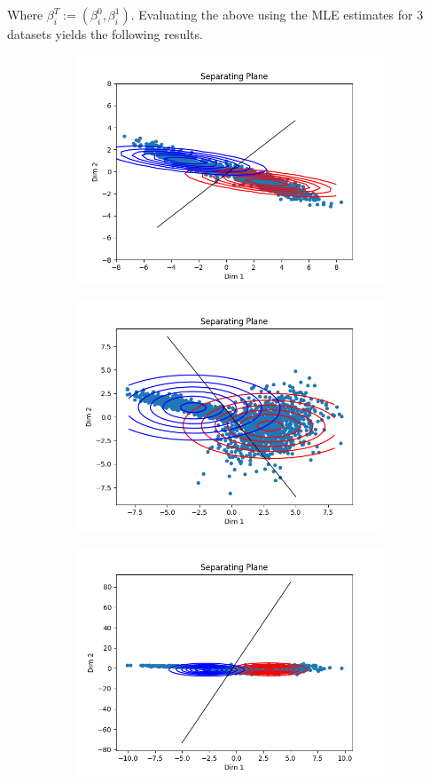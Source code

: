 \documentclass[paper=a4, fontsize=11pt]{scrartcl} %
\numberwithin{equation}{section} %
\numberwithin{figure}{section} %
\numberwithin{table}{section} %
\begin{document}
	Where \(\beta_i^T := (\beta_i^0, \beta_i^1)\). Evaluating the above using the MLE estimates for 3 datasets yields the following results.
	\begin{figure}
	\begin{subfigure}{.5\textwidth}
		\centering
		\includegraphics[width=.9\linewidth]{img.png}
	\end{subfigure}
	\begin{subfigure}{.5\textwidth}
		\centering
		\includegraphics[width=.9\linewidth]{img2.png}
	\end{subfigure}
	\begin{subfigure}{.5\textwidth}
		\centering
		\includegraphics[width=.9\linewidth]{img3.png}

\end{subfigure}
\end{figure}
\end{document}
